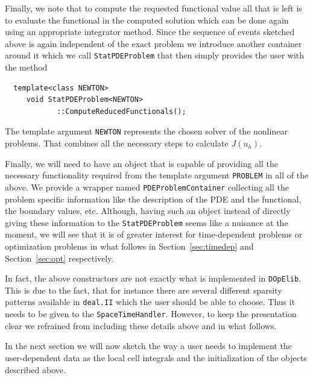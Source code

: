 \documentclass[smallextended]{svjour3}       %
\numberwithin{equation}{section}
\newcommand{\deal}{\texttt{deal.II}}
\newcommand{\dope}{\texttt{DOpElib}}
\begin{document}
Finally, we note that to compute the requested functional value 
all that is left is to evaluate the functional in the computed solution 
which can be done again using an appropriate integrator method.
Since the sequence of events sketched above is again independent of the 
exact problem we introduce another container around it which we call 
\texttt{StatPDEProblem} that then simply provides the user with the 
method
\begin{lstlisting}
  template<class NEWTON>
     void StatPDEProblem<NEWTON>
            ::ComputeReducedFunctionals();
\end{lstlisting}
The template argument \texttt{NEWTON} represents the chosen solver of the nonlinear problems.
That combines all the necessary steps to calculate $J(u_h)$. 

Finally, we will need to have an object that is capable of providing all 
the necessary functionality required from the template argument 
\texttt{PROBLEM} in all of the above. We provide a wrapper named
\texttt{PDEProblemContainer} collecting all the problem specific information 
like the description of the PDE and the functional, the boundary values, etc. 
Although, having such an object instead of directly giving these information
to the \texttt{StatPDEProblem} seems like a nuisance at the moment, we will 
see that it is of greater interest for time-dependent problems or 
optimization problems in what follows in Section~\ref{sec:timedep} and
Section~\ref{sec:opt} respectively. 

\begin{remark}
In fact, the above constructors are not exactly what is implemented in \dope{}.
This is due to the fact, that for instance 
there are several different sparsity patterns available in 
\deal{} which the user should be able to choose. Thus it needs to be 
given to the \texttt{SpaceTimeHandler}. However, to keep the 
presentation clear we refrained from including these details above and in
what follows.
\end{remark} 

In the next section we will now sketch the way a user needs to implement the
user-dependent data as the local cell integrals and the initialization of the
objects described above.
\end{document}
